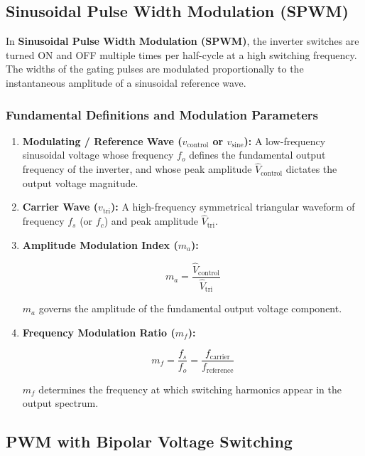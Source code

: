 \documentclass[11pt,a4paper]{article}
\begin{document}
\subsection{Sinusoidal Pulse Width Modulation (SPWM)}

In \textbf{Sinusoidal Pulse Width Modulation (SPWM)}, the inverter switches are turned ON and OFF multiple times per half-cycle at a high switching frequency. The widths of the gating pulses are modulated proportionally to the instantaneous amplitude of a sinusoidal reference wave.

\subsubsection{Fundamental Definitions and Modulation Parameters}
\begin{enumerate}[leftmargin=*]
  \item \textbf{Modulating / Reference Wave ($v_{\text{control}}$ or $v_{\text{sine}}$):} A low-frequency sinusoidal voltage whose frequency $f_o$ defines the fundamental output frequency of the inverter, and whose peak amplitude $\hat{V}_{\text{control}}$ dictates the output voltage magnitude.
  \item \textbf{Carrier Wave ($v_{\text{tri}}$):} A high-frequency symmetrical triangular waveform of frequency $f_s$ (or $f_c$) and peak amplitude $\hat{V}_{\text{tri}}$.
  \item \textbf{Amplitude Modulation Index ($m_a$):}
  \begin{formulabox}
  \begin{equation}
  m_a = \frac{\hat{V}_{\text{control}}}{\hat{V}_{\text{tri}}}
  \label{eq:ma_def}
  \end{equation}
  \end{formulabox}
  $m_a$ governs the amplitude of the fundamental output voltage component.
  \item \textbf{Frequency Modulation Ratio ($m_f$):}
  \begin{formulabox}
  \begin{equation}
  m_f = \frac{f_s}{f_o} = \frac{f_{\text{carrier}}}{f_{\text{reference}}}
  \label{eq:mf_def}
  \end{equation}
  \end{formulabox}
  $m_f$ determines the frequency at which switching harmonics appear in the output spectrum.
\end{enumerate}

\subsection{PWM with Bipolar Voltage Switching}
\end{document}
